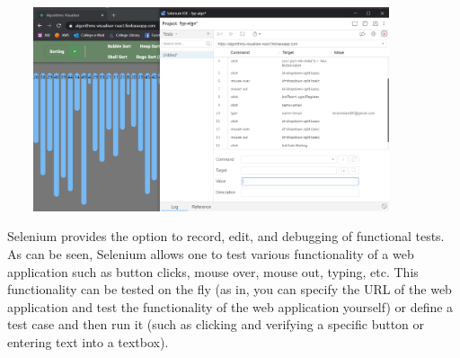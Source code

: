 \begin{center}
    \includegraphics[width=12cm,height=6cm,keepaspectratio]{images/selenium}
\end{center}
Selenium provides the option to record, edit, and debugging of functional tests. As can be seen, Selenium allows one to test various functionality of a web application such as button clicks, mouse over, mouse out, typing, etc. This functionality can be tested on the fly (as in, you can specify the URL of the web application and test the functionality of the web application yourself) or define a test case and then run it (such as clicking and verifying a specific button or entering text into a textbox).